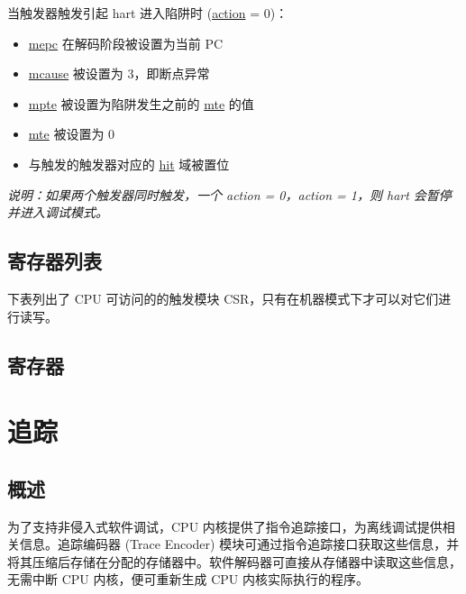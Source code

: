 \documentclass[main\_\_CN.tex]{subfiles}
\begin{document}
当触发器触发引起 hart 进入陷阱时 (\hyperref[fielddesc:MCONTROLACTION]{action} = 0)：
\begin{itemize}
    \item \hyperref[regdesc:MEPC]{mepc} 在解码阶段被设置为当前 PC
    \item \hyperref[regdesc:MCAUSE]{mcause} 被设置为 3，即断点异常
    \item \hyperref[fielddesc:TCONTROLMPTE]{mpte} 被设置为陷阱发生之前的 \hyperref[fielddesc:TCONTROLMTE]{mte} 的值
    \item \hyperref[fielddesc:TCONTROLMTE]{mte} 被设置为 0
    \item 与触发的触发器对应的 \hyperref[fielddesc:MCONTROLHIT]{hit} 域被置位
\end{itemize}

\textit{说明：如果两个触发器同时触发，一个 action = 0，action = 1，则 hart 会暂停并进入调试模式。}


\hypertarget{riscvcpu-hwt-reg-summ}{}
\subsection{寄存器列表}
\label{sec:riscvcpu-hwt-reg-summ}


下表列出了 CPU 可访问的的触发模块 CSR，只有在机器模式下才可以对它们进行读写。




\subsection{寄存器}




\clearpage
\section{追踪}
\label{sec:riscvcpu-trace}

\subsection{概述}
\label{sec:riscvcpu-trace-overview}

为了支持非侵入式软件调试，CPU 内核提供了指令追踪接口，为离线调试提供相关信息。追踪编码器 (Trace Encoder) 模块可通过指令追踪接口获取这些信息，并将其压缩后存储在分配的存储器中。软件解码器可直接从存储器中读取这些信息，无需中断 CPU 内核，便可重新生成 CPU 内核实际执行的程序。
\end{document}
